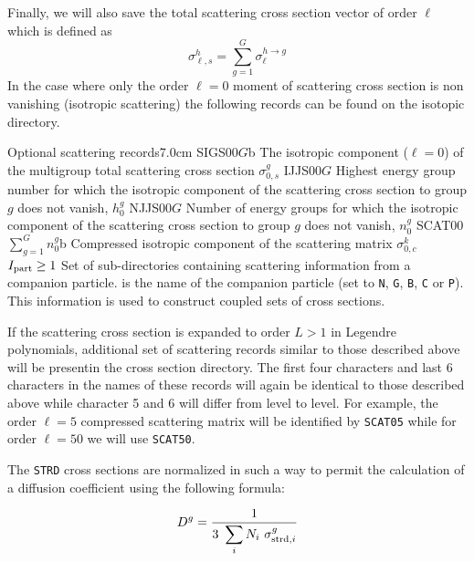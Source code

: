 Finally, we will also save the total scattering cross section vector of order
$\ell$ which is defined as 
  \begin{displaymath}
    \sigma_{\ell,s}^{h}=\sum_{g=1}^{G} \sigma_{\ell}^{h\to g}
  \end{displaymath}
In the case where only the order $\ell=0$ moment of scattering cross section is non
vanishing (isotropic scattering) the following records can be found on the
isotopic directory.

\begin{DescriptionEnregistrement}{Optional scattering records}{7.0cm}
\label{tabl:tabiso5}
\RealEnr
 {SIGS00}{$G$}{b}
 {The isotropic component ($\ell=0$) of the multigroup total scattering cross
  section
  $\sigma_{0,s}^{g}$}
\IntEnr
  {IJJS00}{$G$}
  {Highest energy group number for which 
   the isotropic component of the scattering cross section to group $g$ does not
   vanish, $h_{0}^{g}$}
\IntEnr
  {NJJS00}{$G$}
  {Number of energy groups for which 
   the isotropic component of the scattering cross section to group $g$ does not
   vanish, $n_{0}^{g}$}
\RealEnr
  {SCAT00}{$\sum_{g=1}^{G} n_{0}^{g}$}{b}
  {Compressed isotropic component of the scattering matrix
   $\sigma_{0,c}^{k}$}
\OptDirVar
  {}{$I_{\rm part}\ge 1$}
  {Set of sub-directories containing scattering information from a companion particle. 
  is the name of the companion particle (set to {\tt N}, {\tt G}, {\tt B}, {\tt C} or {\tt P}). This information
  is used to construct coupled sets of cross sections.}
\end{DescriptionEnregistrement}

If the scattering cross section is
expanded to order $L>1$ in Legendre polynomials, additional set of scattering
records similar to those described above will be presentin the cross section directory.
The first four characters and last 6 characters in the names of
these records will again be identical to those described above while character 5
and 6 will differ from level to level. For example, the order
$\ell=5$ compressed scattering matrix will be identified by
\texttt{SCAT05} while for order 
$\ell=50$ we will use \texttt{SCAT50}.

\vskip 0.2cm

The {\tt STRD} cross sections are normalized in such a way to permit the
calculation of a diffusion coefficient using the following formula:

\begin{equation}
D^g={\displaystyle 1\over\displaystyle 3 \ \sum_i N_i \ \sigma_{{\rm strd},i}^g}
\end{equation}

